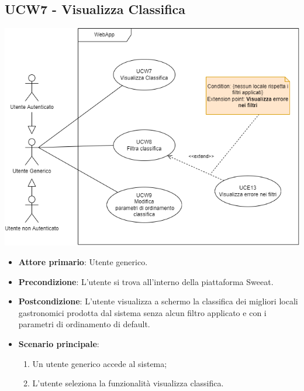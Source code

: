 \subsection{UCW7 - Visualizza Classifica}
\begin{center}
\includegraphics[scale=0.5]{UC_images/UCW7-8-9.png}
\end{center}

\begin{center}
\end{center}
\begin{itemize}
    \item \textbf{Attore primario}: Utente generico.
    \item \textbf{Precondizione}: L’utente si trova all’interno della piattaforma Sweeat.
    \item \textbf{Postcondizione}: L’utente visualizza a schermo la classifica dei migliori locali gastronomici prodotta dal sistema senza alcun filtro applicato e con i parametri di ordinamento di default.
    \item \textbf{Scenario principale}: 
    \begin{enumerate}
        \item Un utente generico accede al sistema;
        \item L’utente seleziona la funzionalità visualizza classifica.
    \end{enumerate}
\end{itemize}

